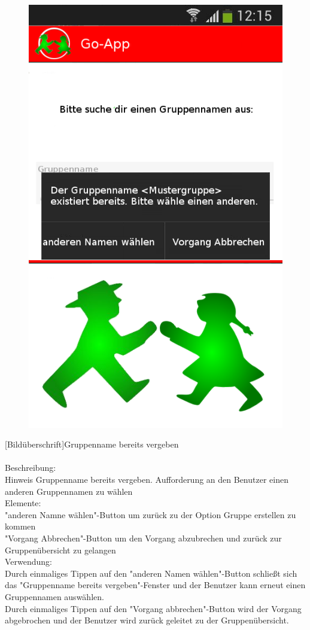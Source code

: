 \begin{figure}
	\includegraphics[scale =1]{resources/images/gruppe_erstellen_ungueltig.png}
\end{figure}
[Bildüberschrift]Gruppenname bereits vergeben\\ \\
[Kleinüberschrift]Beschreibung:\\
Hinweis Gruppenname bereits vergeben. Aufforderung an den Benutzer einen anderen Gruppennamen zu wählen\\
[Kleinüberschrift]Elemente:\\
"anderen Namne wählen"-Button um zurück zu der Option Gruppe erstellen zu kommen\\
"Vorgang Abbrechen"-Button um den Vorgang abzubrechen und zurück zur Gruppenübersicht zu gelangen\\
[Kleinüberschrift]Verwendung:\\
Durch einmaliges Tippen auf den "anderen Namen wählen"-Button schließt sich das "Gruppenname bereits vergeben"-Fenster und der Benutzer kann erneut einen Gruppennamen auswählen.\\
Durch einmaliges Tippen auf den "Vorgang abbrechen"-Button wird der Vorgang abgebrochen und der Benutzer wird zurück geleitet zu der Gruppenübersicht.\\ \\


